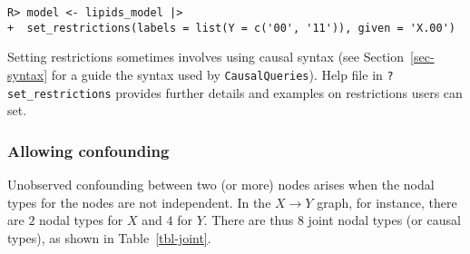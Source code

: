 \documentclass[
  11pt,
  article]{jss}
\begin{document}
\begin{verbatim}
R> model <- lipids_model |>
+  set_restrictions(labels = list(Y = c('00', '11')), given = 'X.00')
\end{verbatim}

Setting restrictions sometimes involves using causal syntax (see
Section~\ref{sec-syntax} for a guide the syntax used by
\texttt{CausalQueries}). Help file in \texttt{?set\_restrictions}
provides further details and examples on restrictions users can set.

\hypertarget{sec-confounding}{%
\subsubsection{Allowing confounding}\label{sec-confounding}}

Unobserved confounding between two (or more) nodes arises when the nodal
types for the nodes are not independent. In the \(X \rightarrow Y\)
graph, for instance, there are \(2\) nodal types for \(X\) and \(4\) for
\(Y\). There are thus 8 joint nodal types (or causal types), as shown in
Table~\ref{tbl-joint}.
\end{document}
